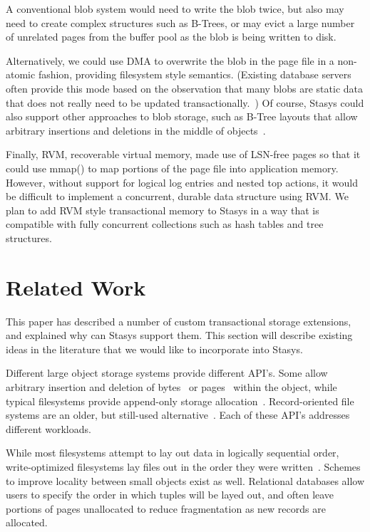 \documentclass[letterpaper,twocolumn,10pt]{article}
\newcommand{\yad}{Stasys\xspace}
\begin{document}
A conventional blob system would need 
to write the blob twice, but also may need to create complex 
structures such as B-Trees, or may evict a large number of 
unrelated pages from the buffer pool as the blob is being written 
to disk.  

Alternatively, we could use DMA to overwrite the blob in the page file
in a non-atomic fashion, providing filesystem style semantics.
(Existing database servers often provide this mode based on the
observation that many blobs are static data that does not really need
to be updated transactionally.~\cite{sqlserver}) Of course, \yad could
also support other approaches to blob storage, such as B-Tree layouts
that allow arbitrary insertions and deletions in the middle of
objects~\cite{esm}.

Finally, RVM, recoverable virtual memory, made use of LSN-free pages
so that it could use mmap() to map portions of the page file into
application memory\cite{rvm}.  However, without support for logical log entries
and nested top actions, it would be difficult to implement a
concurrent, durable data structure using RVM.  We plan to add RVM
style transactional memory to \yad in a way that is compatible with
fully concurrent collections such as hash tables and tree structures.


\section{Related Work}

This paper has described a number of custom transactional storage
extensions, and explained why can \yad support them.  This section
will describe existing ideas in the literature that we would like to
incorporate into \yad.

Different large object storage systems provide different API's.
Some allow arbitrary insertion and deletion of bytes~\cite{esm} or
pages~\cite{sqlserver} within the object, while typical filesystems
provide append-only storage allocation~\cite{ffs,ntfs}.
Record-oriented file systems are an older, but still-used
alternative~\cite{vmsFiles11,gfs}. Each of these API's addresses 
different workloads.

While most filesystems attempt to lay out data in logically sequential
order, write-optimized filesystems lay files out in the order they
were written~\cite{lfs}.  Schemes to improve locality between small
objects exist as well. Relational databases allow users to specify the order
in which tuples will be layed out, and often leave portions of pages
unallocated to reduce fragmentation as new records are allocated.
\end{document}
